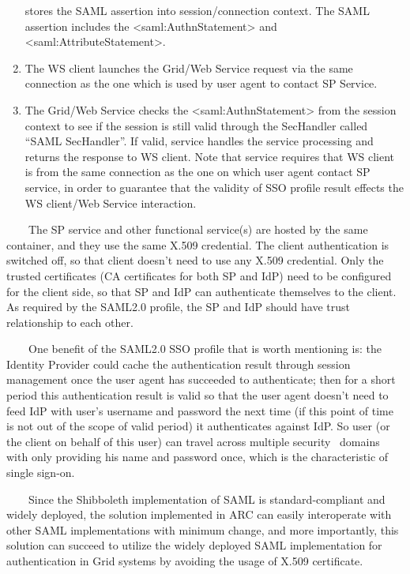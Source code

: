 \documentclass[a4paper]{article}
\begin{document}
\begin{enumerate}
{stores the SAML assertion into session/connection context. The SAML
assertion includes the {\textless}saml:AuthnStatement{\textgreater} and
{\textless}saml:AttributeStatement{\textgreater}.}
\item {\color{black}
The WS client launches the Grid/Web Service request via the same
connection as the one which is used by user agent to contact SP
Service.}
\item {\color{black}
The Grid/Web Service checks the
{\textless}saml:AuthnStatement{\textgreater} from the session context
to see if the session is still valid through the SecHandler called
{\textquotedblleft}SAML SecHandler{\textquotedblright}. If valid,
service handles the service processing and returns the response to WS
client. Note that service requires that WS client is from the same
connection as the one on which user agent contact SP service, in order
to guarantee that the validity of SSO profile result effects the WS
client/Web Service interaction.}
\end{enumerate}
{\upshape\color{black}
\ \ \ \ The SP service and other functional service(s) are hosted by the
same container, and they use the same X.509 credential. The client
authentication is switched off, so that client doesn{\textquoteright}t
need to use any X.509 credential. Only the trusted certificates (CA
certificates for both SP and IdP) need to be configured for the client
side, so that SP and IdP can authenticate themselves to the client. As
required by the SAML2.0 profile, the SP and IdP should have trust
relationship to each other.}

{\upshape\color{black}
\ \ \ \ One benefit of the SAML2.0 SSO profile that is worth mentioning
is: the Identity Provider could cache the authentication result through
session management once the user agent has succeeded to authenticate;
then for a short period this authentication result is valid so that the
user agent doesn{\textquoteright}t need to feed IdP with
user{\textquoteright}s username and password the next time (if this
point of time is not out of the scope of valid period) it authenticates
against IdP. So user (or the client on behalf of this user) can travel
across multiple security \ domains with only providing his name and
password once, which is the characteristic of single sign-on.}

{\upshape\color{black}
\ \ \ \ Since the Shibboleth implementation of SAML is
standard-compliant and widely deployed, the solution implemented in ARC
can easily interoperate with other SAML implementations with minimum
change, and more importantly, this solution can succeed to utilize the
widely deployed SAML implementation for authentication in Grid systems
by avoiding the usage of X.509 certificate.}
\end{document}
